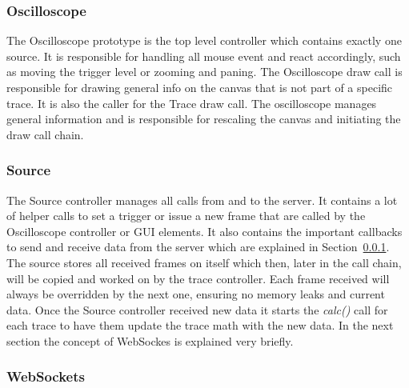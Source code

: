 %
%

\subsubsection*{Oscilloscope}

The Oscilloscope prototype is the top level controller which contains exactly one source. It is responsible for handling all mouse event and react accordingly, such as moving the trigger level or zooming and paning.
The Oscilloscope draw call is responsible for drawing general info on the canvas that is not part of a specific trace.
It is also the caller for the Trace draw call. The oscilloscope manages general information and is responsible for rescaling the canvas and initiating the draw call chain.

\subsubsection*{Source}

The Source controller manages all calls from and to the server. It contains a lot of helper calls to set a trigger or issue a new frame that are called by the Oscilloscope controller or GUI elements.
It also contains the important callbacks to send and receive data from the server which are explained in Section~\ref{subsec:gui:websockets}.
The source stores all received frames on itself which then, later in the call chain, will be copied and worked on by the trace controller.
Each frame received will always be overridden by the next one, ensuring no memory leaks and current data.
Once the Source controller received new data it starts the \textit{calc()} call for each trace to have them update the trace math with the new data.
In the next section the concept of WebSockes is explained very briefly. 

%
%

\subsubsection{WebSockets}
\label{subsec:gui:websockets}

